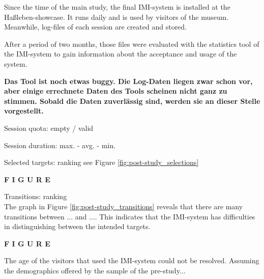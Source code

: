 Since the time of the main study, the final \ac{IMI}-system is installed at the Haßleben-showcase. It runs daily and is used by visitors of the museum. Meanwhile, log-files of each session are created and stored.

After a period of two months, those files were evaluated with the statistics tool of the \ac{IMI}-system to gain information about the acceptance and usage of the system. 

\textbf{Das Tool ist noch etwas buggy. Die Log-Daten liegen zwar schon vor, aber einige errechnete Daten des Tools scheinen nicht ganz zu stimmen. Sobald die Daten zuverlässig sind, werden sie an dieser Stelle vorgestellt.}

Session quota: empty / valid

Session duration: max. - avg. - min.

Selected targets: ranking see Figure \ref{fig:post-study_selections}

\textbf{F I G U R E}

Transitions: ranking 
\\
The graph in Figure \ref{fig:post-study_transitions} reveals that there are many transitions between ... and .... This indicates that the \ac{IMI}-system has difficulties in distinguishing between the intended targets.

\textbf{F I G U R E}

The age of the visitors that used the \ac{IMI}-system could not be resolved. Assuming the demographics offered by the sample of the pre-study...
